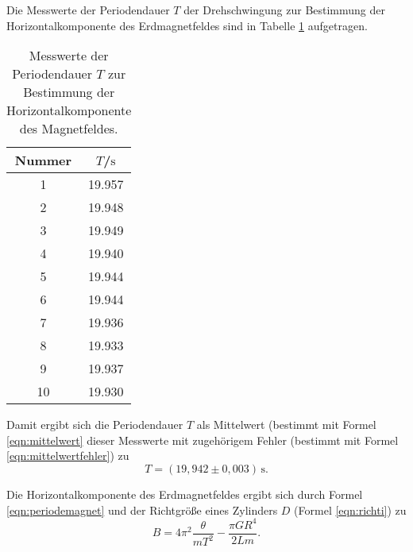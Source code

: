 Die Messwerte der Periodendauer $T$ der Drehschwingung zur Bestimmung der Horizontalkomponente 
des Erdmagnetfeldes sind in Tabelle \ref{tab:magnetusmaximus} aufgetragen.
\begin{table}
	\caption{Messwerte der Periodendauer $T$ zur Bestimmung der Horizontalkomponente 
	des Magnetfeldes.}
	\label{tab:magnetusmaximus}
	\centering
	\begin{tabular}{cc}
		\toprule
		Nummer & $T$/$\si{\second}$ \\
		\midrule
		1 & 19.957 \\
		2 & 19.948 \\
		3 & 19.949 \\
		4 & 19.940 \\
		5 & 19.944 \\
		6 & 19.944 \\
		7 & 19.936 \\
		8 & 19.933 \\
		9 & 19.937 \\
		10 & 19.930 \\
		\bottomrule
	\end{tabular}
\end{table}
Damit ergibt sich die Periodendauer $T$ als Mittelwert (bestimmt mit Formel
\eqref{eqn:mittelwert} dieser Messwerte mit zugehörigem Fehler (bestimmt mit Formel
\eqref{eqn:mittelwertfehler}) zu 
\begin{equation*}
	T = (19,942 \pm 0,003) \, \si{\second} \mathrm{.}
\end{equation*}

Die Horizontalkomponente des Erdmagnetfeldes ergibt sich durch Formel \eqref{eqn:periodemagnet} 
und der Richtgröße eines Zylinders $D$ (Formel \eqref{eqn:richti}) zu
\begin{equation}
	B = 4\pi^2\frac{\theta}{m T^2} - \frac{\pi G R^4}{2Lm} \mathrm{.} 
\end{equation}
